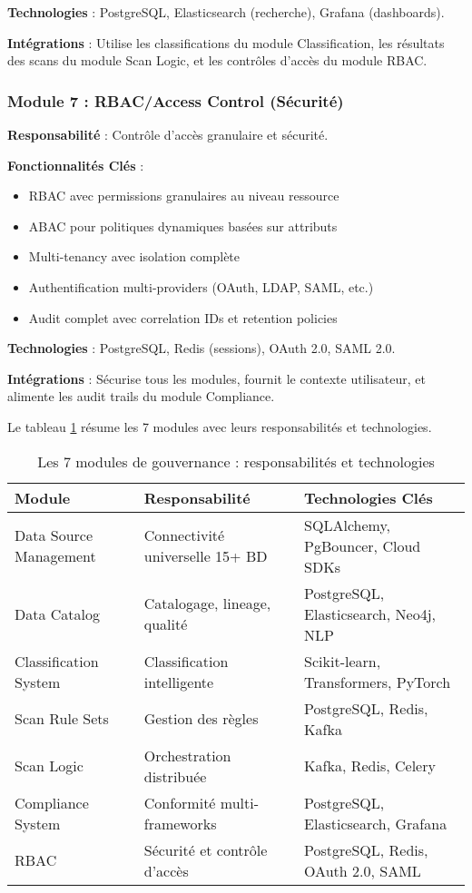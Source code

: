 \textbf{Technologies} : PostgreSQL, Elasticsearch (recherche), Grafana (dashboards).

\textbf{Intégrations} : Utilise les classifications du module Classification, les résultats des scans du module Scan Logic, et les contrôles d'accès du module RBAC.

\subsubsection{Module 7 : RBAC/Access Control (Sécurité)}

\textbf{Responsabilité} : Contrôle d'accès granulaire et sécurité.

\textbf{Fonctionnalités Clés} :
\begin{itemize}
    \item RBAC avec permissions granulaires au niveau ressource
    \item ABAC pour politiques dynamiques basées sur attributs
    \item Multi-tenancy avec isolation complète
    \item Authentification multi-providers (OAuth, LDAP, SAML, etc.)
    \item Audit complet avec correlation IDs et retention policies
\end{itemize}

\textbf{Technologies} : PostgreSQL, Redis (sessions), OAuth 2.0, SAML 2.0.

\textbf{Intégrations} : Sécurise tous les modules, fournit le contexte utilisateur, et alimente les audit trails du module Compliance.

Le tableau \ref{tab:modules_gouvernance} résume les 7 modules avec leurs responsabilités et technologies.

\begin{table}[htpb]
\centering
\caption{Les 7 modules de gouvernance : responsabilités et technologies}
\label{tab:modules_gouvernance}
\begin{tabular}{|p{}|p{}|p{}|}
\hline
\textbf{Module} & \textbf{Responsabilité} & \textbf{Technologies Clés} \\
\hline
Data Source Management & Connectivité universelle 15+ BD & SQLAlchemy, PgBouncer, Cloud SDKs \\
\hline
Data Catalog & Catalogage, lineage, qualité & PostgreSQL, Elasticsearch, Neo4j, NLP \\
\hline
Classification System & Classification intelligente & Scikit-learn, Transformers, PyTorch \\
\hline
Scan Rule Sets & Gestion des règles & PostgreSQL, Redis, Kafka \\
\hline
Scan Logic & Orchestration distribuée & Kafka, Redis, Celery \\
\hline
Compliance System & Conformité multi-frameworks & PostgreSQL, Elasticsearch, Grafana \\
\hline
RBAC & Sécurité et contrôle d'accès & PostgreSQL, Redis, OAuth 2.0, SAML \\
\hline
\end{tabular}
\end{table}

